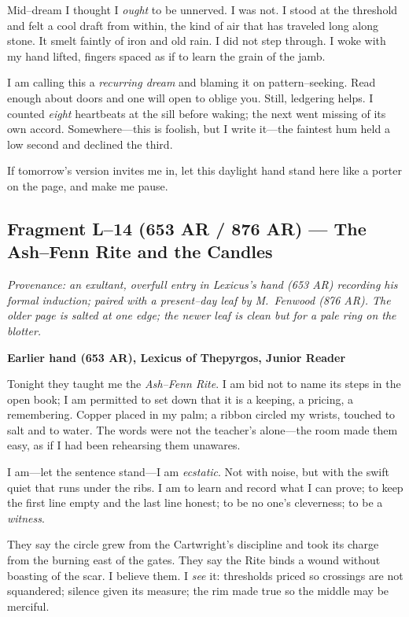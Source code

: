 \documentclass[11pt]{article}
\begin{document}
Mid–dream I thought I \emph{ought} to be unnerved. I was not. I stood at the threshold and felt a cool draft from within, the kind of air that has traveled long along stone. It smelt faintly of iron and old rain. I did not step through. I woke with my hand lifted, fingers spaced as if to learn the grain of the jamb.

I am calling this a \emph{recurring dream} and blaming it on pattern–seeking. Read enough about doors and one will open to oblige you. Still, ledgering helps. I counted \emph{eight} heartbeats at the sill before waking; the next went missing of its own accord. Somewhere—this is foolish, but I write it—the faintest hum held a low second and declined the third.

If tomorrow’s version invites me in, let this daylight hand stand here like a porter on the page, and make me pause.

\bigskip

\subsection{Fragment L--14 (653 AR / 876 AR) — The Ash–Fenn Rite and the Candles}
\label{frag:l14}

\noindent\textit{Provenance: an exultant, overfull entry in Lexicus’s hand (653 AR) recording his formal induction; paired with a present–day leaf by M.\ Fenwood (876 AR). The older page is salted at one edge; the newer leaf is clean but for a pale ring on the blotter.}

\medskip
\noindent\textbf{Earlier hand (653 AR), Lexicus of Thepyrgos, Junior Reader}

Tonight they taught me the \textit{Ash–Fenn Rite}. I am bid not to name its steps in the open book; I am permitted to set down that it is a keeping, a pricing, a remembering. Copper placed in my palm; a ribbon circled my wrists, touched to salt and to water. The words were not the teacher’s alone—the room made them easy, as if I had been rehearsing them unawares.

I am—let the sentence stand—I am \emph{ecstatic}. Not with noise, but with the swift quiet that runs under the ribs. I am to learn and record what I can prove; to keep the first line empty and the last line honest; to be no one’s cleverness; to be a \emph{witness}.

They say the circle grew from the Cartwright’s discipline and took its charge from the burning east of the gates. They say the Rite binds a wound without boasting of the scar. I believe them. I \emph{see} it: thresholds priced so crossings are not squandered; silence given its measure; the rim made true so the middle may be merciful.
\end{document}

